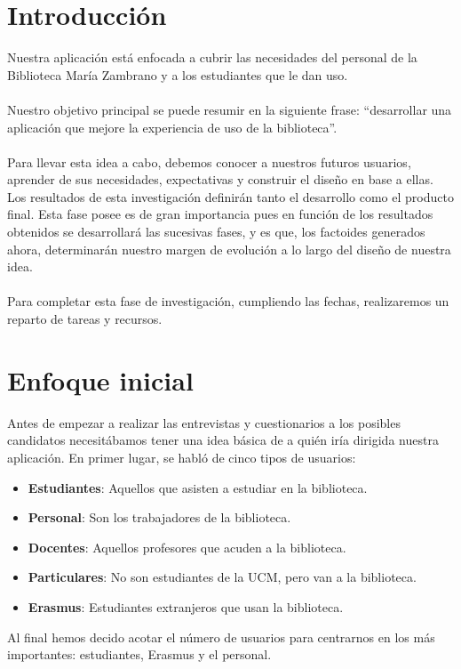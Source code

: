 \documentclass[12pt]{article}
\begin{document}
\section{Introducción}
Nuestra aplicación está enfocada a cubrir las necesidades del personal de la Biblioteca María Zambrano y a los estudiantes que le dan uso.
\\
\\
Nuestro objetivo principal se puede resumir en la siguiente frase:
“desarrollar una aplicación que mejore la experiencia de uso de la biblioteca”.
\\
\\
Para llevar esta idea a cabo, debemos conocer a nuestros futuros usuarios, aprender de sus necesidades, expectativas y construir el diseño en base a ellas. Los resultados de esta investigación definirán tanto el desarrollo como el producto final. Esta fase posee es de gran importancia pues en función de los resultados obtenidos se desarrollará las sucesivas fases, y es que, los factoides generados ahora, determinarán nuestro margen de evolución a lo largo del diseño de nuestra idea.
\\
\\
Para completar esta fase de investigación, cumpliendo las fechas, realizaremos un reparto de tareas y recursos. 
\section{Enfoque inicial}
Antes de empezar a realizar las entrevistas y cuestionarios a los posibles candidatos necesitábamos tener una idea básica de a quién iría dirigida nuestra aplicación. En primer lugar, se habló de cinco tipos de usuarios:
\begin{itemize}

\item \textbf{Estudiantes}: Aquellos que asisten a estudiar en la biblioteca.
\item \textbf{Personal}: Son los trabajadores de la biblioteca.
\item \textbf{Docentes}: Aquellos profesores que acuden a la biblioteca.
\item \textbf{Particulares}: No son estudiantes de la UCM, pero van a la biblioteca.
\item \textbf{Erasmus}: Estudiantes extranjeros que usan la biblioteca.

\end{itemize}
Al final hemos decido acotar el número de usuarios para centrarnos en los más importantes: estudiantes, Erasmus y el personal.
\end{document}
